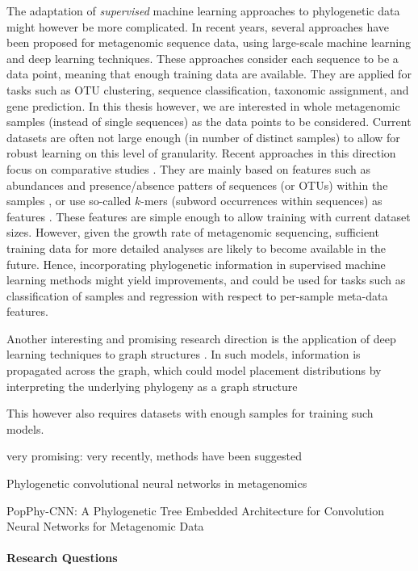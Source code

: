 The adaptation of \emph{supervised} machine learning approaches to phylogenetic data might however be more complicated.
In recent years, several approaches have been proposed for metagenomic sequence data,
using large-scale machine learning \cite{Vervier2015,Soueidan2015}
and deep learning \cite{Angermueller2016,Fiannaca2018} techniques.
These approaches consider each sequence to be a data point, meaning that enough training data are available.
They are applied for tasks such as OTU clustering, sequence classification, taxonomic assignment, and gene prediction.
In this thesis however, we are interested in whole metagenomic samples (instead of single sequences)
as the data points to be considered.
Current datasets are often not large enough (in number of distinct samples)
to allow for robust learning on this level of granularity.
Recent approaches in this direction focus on comparative studies \cite{Soueidan2015}.
They are mainly based on features such as
abundances and presence/absence patters of sequences (or \acsp{OTU}) within the samples \cite{Pasolli2016},
or use so-called $k$-mers (subword occurrences within sequences) as features \cite{Asgari2015}.
These features are simple enough to allow training with current dataset sizes.
However, given the growth rate of metagenomic sequencing,
sufficient training data for more detailed analyses are likely to become available in the future.
Hence, incorporating phylogenetic information in supervised machine learning methods might yield improvements,
and could be used for tasks such as classification of samples and regression with respect to per-sample meta-data features.

Another interesting and promising research direction is the application of deep learning techniques
to graph structures \cite{Scarselli2009,Bronstein2017}.
In such models, information is propagated across the graph,
which could model placement distributions by interpreting the underlying phylogeny as a graph structure
\todo{}

This however also requires datasets with enough samples for training such models.

very promising: very recently, methods have been suggested

Phylogenetic convolutional neural networks in metagenomics
\cite{Fioravanti2018}

PopPhy-CNN: A Phylogenetic Tree Embedded Architecture for Convolution Neural Networks for
Metagenomic Data
\cite{Reiman2018}

\paragraph{Research Questions}
\label{ch:ConclusionOutlook:par:ResearchQuestions}

